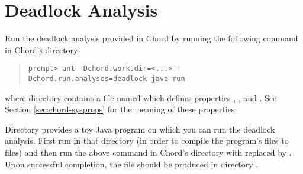\section{Deadlock Analysis}
\label{sec:deadlock}

Run the deadlock analysis provided in Chord by running the following command in Chord's  directory:

\begin{quote}
\begin{verbatim}
prompt> ant -Dchord.work.dir=<...> -Dchord.run.analyses=deadlock-java run
\end{verbatim}
\end{quote}

\noindent where directory  contains a file named  which
defines properties , , and .
See Section \ref{sec:chord-sysprops} for the meaning of these properties.

Directory  provides a toy Java program on which you can run
the deadlock analysis.
First run  in that directory (in order to compile the program's  files to
 files) and then run the above command in Chord's  directory with
 replaced by .
Upon successful completion, the file  should be produced in directory
.


